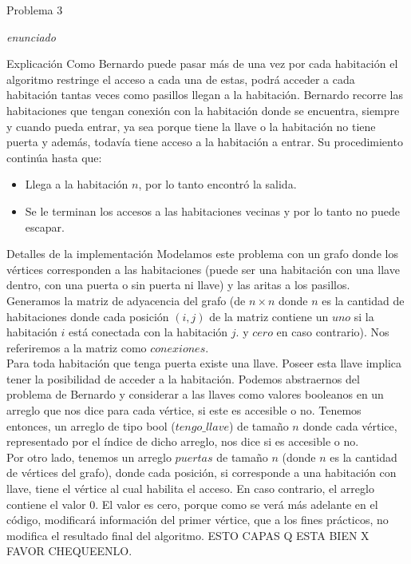 \begin{section}{Problema 3}

	\textit{enunciado}

	\begin{subsection}{Explicación}
		Como Bernardo puede pasar más de una vez por cada habitación el algoritmo restringe el acceso a cada una de estas, podrá acceder a cada habitación tantas veces como pasillos llegan a la habitación.
		Bernardo recorre las habitaciones que tengan conexión con la habitación donde se encuentra, siempre y cuando pueda entrar, ya sea porque tiene la llave o la habitación no tiene puerta y además, todavía tiene acceso a la habitación a entrar. Su procedimiento continúa hasta que:
		\begin{itemize}
			\item Llega a la habitación $n$, por lo tanto encontró la salida.
			\item Se le terminan los accesos a las habitaciones vecinas y por lo tanto no puede escapar.
		\end{itemize}

	\end{subsection}

	\begin{subsection}{Detalles de la implementación}
		Modelamos este problema con un grafo donde los vértices corresponden a las habitaciones (puede ser una habitación con una llave dentro, con una puerta o sin puerta ni llave) y las aritas a los pasillos.\\	

		Generamos la matriz de adyacencia del grafo (de $n\times n$ donde $n$ es la cantidad de habitaciones donde cada posición $(i,j)$ de la matriz contiene un $uno$ si la habitación $i$ está conectada con la habitación $j$. y $cero$ en caso contrario). Nos referiremos a la matriz como $conexiones$.\\

		Para toda habitación que tenga puerta existe una llave. Poseer esta llave implica tener la posibilidad de acceder a la habitación. Podemos abstraernos del problema de Bernardo y considerar a las llaves como valores booleanos en un arreglo que nos dice para cada vértice, si este es accesible o no. Tenemos entonces, un arreglo de tipo bool ($tengo\_llave$) de tamaño $n$ donde cada vértice, representado por el índice de dicho arreglo, nos dice si es accesible o no.\\

		Por otro lado, tenemos un arreglo $puertas$ de tamaño $n$ (donde $n$ es la cantidad de vértices del grafo), donde cada posición, si corresponde a una habitación con llave, tiene el vértice al cual habilita el acceso. En caso contrario, el arreglo contiene el valor $0$. El valor es cero, porque como se verá más adelante en el código, modificará información del primer vértice, que a los fines prácticos, no modifica el resultado final del algoritmo. ESTO CAPAS Q ESTA BIEN X FAVOR CHEQUEENLO.\\


\end{subsection}
\end{section}
